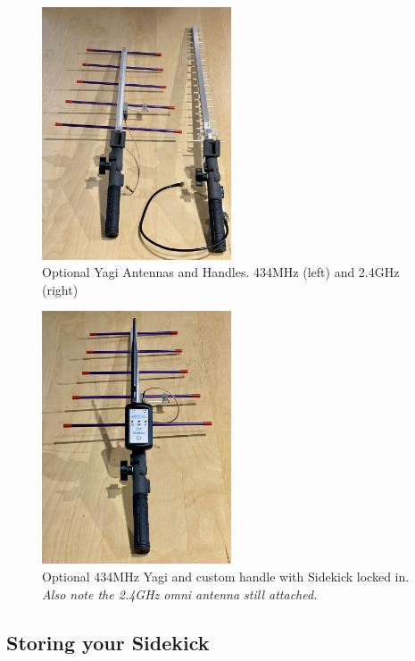 \documentclass[
]{article}
\begin{document}
\begin{figure}
\hypertarget{id}{%
\centering
\includegraphics[width=0.5\textwidth,height=\textheight]{./images/sidekick_yagiAntennas.JPG}
\caption{Optional Yagi Antennas and Handles. 434MHz (left) and 2.4GHz
(right)}\label{id}
}
\end{figure}

\begin{figure}
\hypertarget{id}{%
\centering
\includegraphics[width=0.5\textwidth,height=\textheight]{./images/sidekick_434MHzYagi.JPG}
\caption{Optional 434MHz Yagi and custom handle with Sidekick locked in.
\emph{Also note the 2.4GHz omni antenna still attached.}}\label{id}
}
\end{figure}

\hypertarget{storing-your-sidekick}{%
\subsection{Storing your Sidekick}\label{storing-your-sidekick}}
\end{document}
